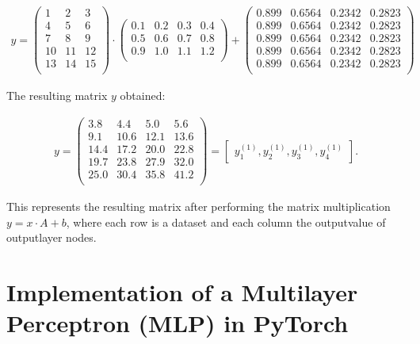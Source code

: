 \begin{align}
	y = \begin{pmatrix}
		1 & 2 & 3 \\
		4 & 5 & 6 \\
		7 & 8 & 9 \\
		10 & 11 & 12 \\
		13 & 14 & 15 \\
	\end{pmatrix} \cdot \begin{pmatrix}
		0.1 & 0.2 & 0.3 & 0.4 \\
		0.5 & 0.6 & 0.7 & 0.8 \\
		0.9 & 1.0 & 1.1 & 1.2 \\
	\end{pmatrix} + \begin{pmatrix}
		0.899 & 0.6564 & 0.2342 & 0.2823\\
		0.899 & 0.6564 & 0.2342 & 0.2823\\
		0.899 & 0.6564 & 0.2342 & 0.2823\\
		0.899 & 0.6564 & 0.2342 & 0.2823\\
		0.899 & 0.6564 & 0.2342 & 0.2823\\
	\end{pmatrix}
\end{align}

The resulting matrix $y$ obtained:

\begin{align}
	y = \begin{pmatrix}
		3.8 & 4.4 & 5.0 & 5.6 \\
		9.1 & 10.6 & 12.1 & 13.6 \\
		14.4 & 17.2 & 20.0 & 22.8 \\
		19.7 & 23.8 & 27.9 & 32.0 \\
		25.0 & 30.4 & 35.8 & 41.2 \\
	\end{pmatrix} = \begin{bmatrix}
		y^{(1)}_1, y^{(1)}_2,  y^{(1)}_3, y^{(1)}_4
	\end{bmatrix}.
\end{align}

This represents the resulting matrix after performing the matrix multiplication $y = x \cdot A +b$, where each row is a dataset and each column the outputvalue of outputlayer nodes.\\

\section{Implementation of a Multilayer Perceptron (MLP) in PyTorch}

